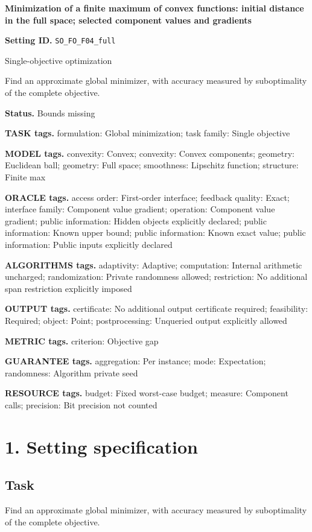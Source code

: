\documentclass[10pt,a4paper]{article}
\begin{document}
\raggedright

{\LARGE\bfseries\sffamily\color{AtlasNavy} Minimization of a finite maximum of convex functions: initial distance in the full space; selected component values and gradients\par}\vspace{5pt}
\textbf{Setting ID.} \texttt{SO\_\allowbreak{}FO\_\allowbreak{}F04\_\allowbreak{}full}

Single-objective optimization

Find an approximate global minimizer, with accuracy measured by suboptimality of the complete objective.

\textbf{Status.} Bounds missing

\textbf{TASK tags.} formulation: Global minimization; task family: Single objective

\textbf{MODEL tags.} convexity: Convex; convexity: Convex components; geometry: Euclidean ball; geometry: Full space; smoothness: Lipschitz function; structure: Finite max

\textbf{ORACLE tags.} access order: First-order interface; feedback quality: Exact; interface family: Component value gradient; operation: Component value gradient; public information: Hidden objects explicitly declared; public information: Known upper bound; public information: Known exact value; public information: Public inputs explicitly declared

\textbf{ALGORITHMS tags.} adaptivity: Adaptive; computation: Internal arithmetic uncharged; randomization: Private randomness allowed; restriction: No additional span restriction explicitly imposed

\textbf{OUTPUT tags.} certificate: No additional output certificate required; feasibility: Required; object: Point; postprocessing: Unqueried output explicitly allowed

\textbf{METRIC tags.} criterion: Objective gap

\textbf{GUARANTEE tags.} aggregation: Per instance; mode: Expectation; randomness: Algorithm private seed

\textbf{RESOURCE tags.} budget: Fixed worst-case budget; measure: Component calls; precision: Bit precision not counted

\section{1. Setting specification}
\subsection{Task}
Find an approximate global minimizer, with accuracy measured by suboptimality of the complete objective.
\end{document}
